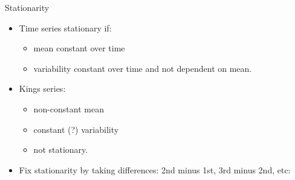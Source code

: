 \begin{frame}[fragile]{Stationarity}
  
  \begin{itemize}
  \item Time series stationary if:
    \begin{itemize}
    \item mean constant over time
    \item variability constant over time and not dependent on mean.
    \end{itemize}
  \item Kings series:
    \begin{itemize}
    \item non-constant mean
    \item constant (?) variability
    \item not stationary.
    \end{itemize}
  \item Fix stationarity by taking differences: 2nd minus 1st, 3rd
    minus 2nd, etc:
\begin{knitrout}
\color{fgcolor}\begin{kframe}
\begin{alltt}
\hlkwb{=}
\end{alltt}
\end{kframe}
\end{knitrout}
  \end{itemize}
  
\end{frame}


